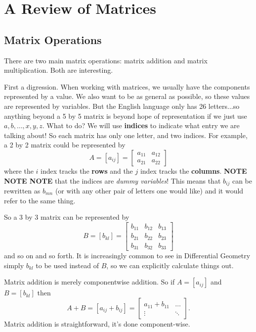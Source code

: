 \section{A Review of Matrices}\label{appendixMatrix}


\subsection{Matrix Operations}

There are two main matrix operations: matrix addition and matrix multiplication. Both are interesting.

First a digression. When working with matrices, we usually have the components represented by a value. We also want to be as general as possible, so these values are represented by variables. But the English language only has 26 letters...so anything beyond a 5 by 5 matrix is beyond hope of representation if we just use $a,b,\ldots,x,y,z$. What to do? We will use \textbf{indices} to indicate what entry we are talking about! So each matrix has only one letter, and two indices. For example, a 2 by 2 matrix could be represented by
\begin{equation}
A = [a_{ij}] = \left[
\begin{array}{cc}
a_{11} & a_{12} \\
a_{21} & a_{22}
\end{array}
\right]
\end{equation}
where the $i$ index tracks the \textbf{rows} and the $j$ index tracks the \textbf{columns}. \textbf{NOTE NOTE NOTE} that the indices are \emph{dummy variables}! This means that $b_{ij}$ can be rewritten as $b_{mn}$ (or with any other pair of letters one would like) and it would refer to the same thing.

So a 3 by 3 matrix can be represented by
\begin{equation}
B = [b_{kl}] =
\begin{bmatrix}
b_{11} & b_{12} & b_{13} \\
b_{21} & b_{22} & b_{23} \\
b_{31} & b_{32} & b_{33}
\end{bmatrix}
\end{equation}
and so on and so forth. It is increasingly common to see in Differential Geometry simply $b_{kl}$ to be used instead of $B$, so we can explicitly calculate things out.

Matrix addition is merely componentwise addition. So if $A = [a_{ij}]$ and $B = [b_{kl}]$ then
\begin{equation}
A + B = [a_{ij} + b_{ij}] = \begin{bmatrix}
a_{11}+b_{11} & \ldots \\
\vdots & \ddots
\end{bmatrix}.
\end{equation}
Matrix addition is straightforward, it's done component-wise.

